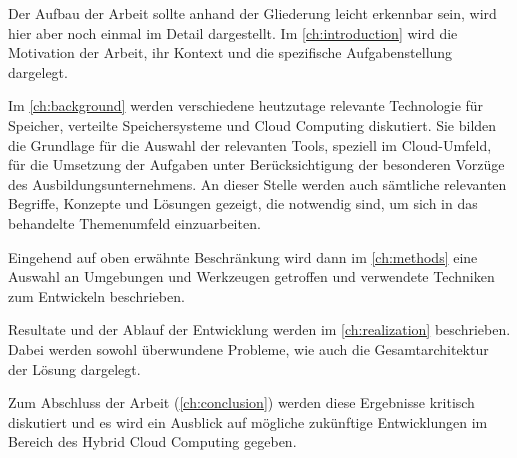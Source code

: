 Der Aufbau der Arbeit sollte anhand der Gliederung leicht erkennbar sein, wird hier aber noch einmal im Detail dargestellt. Im \autoref{ch:introduction} wird die Motivation der Arbeit, ihr Kontext und die spezifische Aufgabenstellung dargelegt.

Im \autoref{ch:background} werden verschiedene heutzutage relevante Technologie für Speicher, verteilte Speichersysteme und Cloud Computing diskutiert. Sie bilden die Grundlage für die Auswahl der relevanten Tools, speziell im Cloud-Umfeld, für die Umsetzung der Aufgaben unter Berücksichtigung der besonderen Vorzüge des Ausbildungsunternehmens.
An dieser Stelle werden auch sämtliche relevanten Begriffe, Konzepte und Lösungen gezeigt, die notwendig sind, um sich in das behandelte Themenumfeld einzuarbeiten.

Eingehend auf oben erwähnte Beschränkung wird dann im \autoref{ch:methods} eine Auswahl an Umgebungen und Werkzeugen getroffen und verwendete Techniken zum Entwickeln beschrieben.

Resultate und der Ablauf der Entwicklung werden im \autoref{ch:realization} beschrieben. Dabei werden sowohl überwundene Probleme, wie auch die Gesamtarchitektur der Lösung dargelegt.

Zum Abschluss der Arbeit (\autoref{ch:conclusion}) werden diese Ergebnisse kritisch diskutiert und es wird ein Ausblick auf mögliche zukünftige Entwicklungen im Bereich des Hybrid Cloud Computing gegeben.
